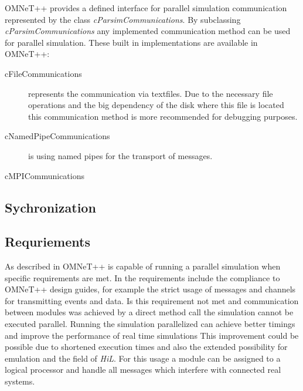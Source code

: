 OMNeT++ provides a defined interface for parallel simulation communication represented by the class \emph{cParsimCommunications}.
By subclassing \emph{cParsimCommunications} any implemented communication method can be used for parallel simulation.
These built in implementations are available in OMNeT++: \cite{omnet_par_api}

\begin{description}
    \item[cFileCommunications] represents the communication via textfiles.
                               Due to the necessary file operations and the big dependency of the disk where this file is located this communication method is more recommended for debugging purposes.
    \item[cNamedPipeCommunications] is using named pipes for the transport of messages.
    \item[cMPICommunications] 
\end{description}


\subsection{Sychronization}
\label{sec:parallel_omnet_sync}

\subsection{Requriements}
\label{sec:parallel_omnet_requirements}

As described in \cite{varga_parallel_2003} OMNeT++ is capable of running a parallel simulation when specific requirements are met.
In \cite{varga_parallel_2003} the requirements include the compliance to OMNeT++ design guides, for example the strict usage of messages and channels for transmitting events and data.
Is this requirement not met and communication between modules was achieved by a direct method call the simulation cannot be executed parallel.
Running the simulation parallelized can achieve better timings and improve the performance of real time simulations
This improvement could be possible due to shortened execution times and also the extended possibility for emulation and the field of \emph{HiL}.
For this usage a module can be assigned to a logical processor and handle all messages which interfere with connected real systems.

